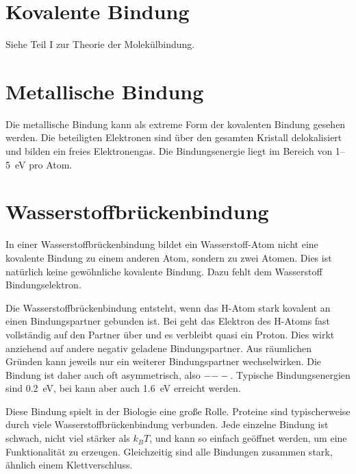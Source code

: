 \section{Kovalente Bindung}

Siehe Teil I zur Theorie der Molekülbindung.


\section{Metallische Bindung}

Die metallische Bindung kann als extreme Form der kovalenten Bindung gesehen werden. Die beteiligten Elektronen sind über den gesamten Kristall delokalisiert und bilden ein freies Elektronengas. Die Bindungsenergie liegt im Bereich von 1--5~eV pro Atom.

\section{Wasserstoffbrückenbindung}

In einer Wasserstoffbrückenbindung bildet ein Wasserstoff-Atom nicht eine kovalente Bindung zu einem anderen Atom, sondern zu zwei Atomen. Dies ist natürlich keine gewöhnliche kovalente Bindung. Dazu fehlt dem Wasserstoff  Bindungselektron.

Die Wasserstoffbrückenbindung entsteht, wenn das H-Atom stark kovalent an einen Bindungspartner gebunden ist. Bei geht das Elektron des H-Atoms fast vollständig auf den Partner über und es verbleibt quasi ein Proton. Dies wirkt anziehend auf andere negativ geladene Bindungspartner. Aus räumlichen Gründen kann jeweils nur ein weiterer Bindungspartner wechselwirken. Die Bindung ist daher auch oft asymmetrisch, also $-$$--$. Typische Bindungsenergien sind 0.2~eV, bei  kann aber auch 1.6~eV erreicht werden.

Diese Bindung spielt in der Biologie eine große Rolle. Proteine sind typischerweise durch viele Wasserstoffbrückenbindung verbunden. Jede einzelne Bindung ist schwach, nicht viel stärker als $k_B T$, und kann so einfach geöffnet werden, um eine Funktionalität zu erzeugen. Gleichzeitig sind alle Bindungen zusammen stark, ähnlich einem Klettverschluss.






\printbibliography[segment=\therefsegment,heading=subbibliography]
